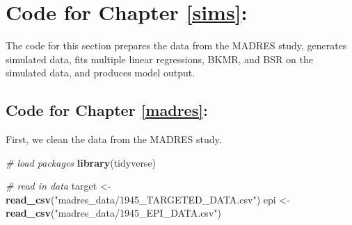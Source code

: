 \documentclass[12pt, twoside]{amherstthesis}
\newenvironment{Shaded}{\begin{snugshade}}{\end{snugshade}}
\newcommand{\CommentTok}[1]{\textcolor[rgb]{0.56,0.35,0.01}{\textit{#1}}}
\newcommand{\FunctionTok}[1]{\textcolor[rgb]{0.13,0.29,0.53}{\textbf{#1}}}
\newcommand{\NormalTok}[1]{#1}
\newcommand{\OtherTok}[1]{\textcolor[rgb]{0.56,0.35,0.01}{#1}}
\newcommand{\StringTok}[1]{\textcolor[rgb]{0.31,0.60,0.02}{#1}}
\begin{document}
\hypertarget{code-for-chapter-refsims}{%
\section{Code for Chapter \ref{sims}:}\label{code-for-chapter-refsims}}

The code for this section prepares the data from the MADRES study, generates simulated data, fits multiple linear regressions, BKMR, and BSR on the simulated data, and produces model output.

\hypertarget{code-for-chapter-refmadres}{%
\subsection{Code for Chapter \ref{madres}:}\label{code-for-chapter-refmadres}}

First, we clean the data from the MADRES study.

\scriptsize
\begin{Shaded}
\begin{Highlighting}[]
\CommentTok{\# load packages}
\FunctionTok{library}\NormalTok{(tidyverse)}
\end{Highlighting}
\end{Shaded}
\normalsize

\scriptsize
\begin{Shaded}
\begin{Highlighting}[]
\CommentTok{\# read in data}
\NormalTok{target }\OtherTok{\textless{}{-}} \FunctionTok{read\_csv}\NormalTok{(}\StringTok{"madres\_data/1945\_TARGETED\_DATA.csv"}\NormalTok{)}
\NormalTok{epi }\OtherTok{\textless{}{-}} \FunctionTok{read\_csv}\NormalTok{(}\StringTok{"madres\_data/1945\_EPI\_DATA.csv"}\NormalTok{)}
\end{Highlighting}
\end{Shaded}
\normalsize
\end{document}
